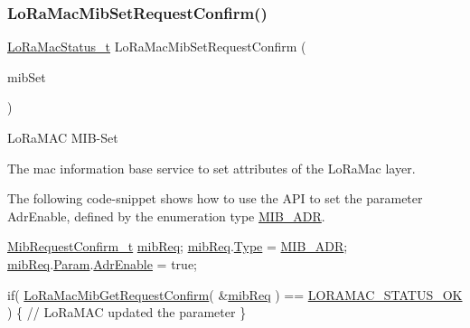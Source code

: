 \subsubsection{\texorpdfstring{Lo\+Ra\+Mac\+Mib\+Set\+Request\+Confirm()}{LoRaMacMibSetRequestConfirm()}}
{\footnotesize\ttfamily \mbox{\hyperlink{group___l_o_r_a_m_a_c_ga30bd25657e10480f8605ee951b0ecfbd}{Lo\+Ra\+Mac\+Status\+\_\+t}} Lo\+Ra\+Mac\+Mib\+Set\+Request\+Confirm (\begin{DoxyParamCaption}\item[{\mbox{\hyperlink{group___l_o_r_a_m_a_c_ga9269d5ae88dd157a58e9d60f680d63f0}{Mib\+Request\+Confirm\+\_\+t}} $\ast$}]{mib\+Set }\end{DoxyParamCaption})}



Lo\+Ra\+M\+AC M\+I\+B-\/\+Set 

The mac information base service to set attributes of the Lo\+Ra\+Mac layer.

The following code-\/snippet shows how to use the A\+PI to set the parameter Adr\+Enable, defined by the enumeration type \mbox{\hyperlink{group___l_o_r_a_m_a_c_gga32ea83d13a3f5bb4b3ec2ace2319ab61a756ff0b66217e3e4ddd0442c8aa56802}{M\+I\+B\+\_\+\+A\+DR}}.


\begin{DoxyCode}
\mbox{\hyperlink{structe_mib_request_confirm}{MibRequestConfirm\_t}} \mbox{\hyperlink{lora_8c_a553baee9b2c1a2c0aa6334bb5560f3d1}{mibReq}};
\mbox{\hyperlink{lora_8c_a553baee9b2c1a2c0aa6334bb5560f3d1}{mibReq}}.\mbox{\hyperlink{structe_mib_request_confirm_ada1f9249fb28125c69bdfacfaeeae0e2}{Type}} = \mbox{\hyperlink{group___l_o_r_a_m_a_c_gga32ea83d13a3f5bb4b3ec2ace2319ab61a756ff0b66217e3e4ddd0442c8aa56802}{MIB\_ADR}};
\mbox{\hyperlink{lora_8c_a553baee9b2c1a2c0aa6334bb5560f3d1}{mibReq}}.\mbox{\hyperlink{structe_mib_request_confirm_afb8c77b3200d879d36beed691fb71f8d}{Param}}.\mbox{\hyperlink{unionu_mib_param_a04efa8698eeea64f27b216d64e598c0d}{AdrEnable}} = \textcolor{keyword}{true};

\textcolor{keywordflow}{if}( \mbox{\hyperlink{group___l_o_r_a_m_a_c_ga3e208a4f73213aa801eeb9d9da7b71dd}{LoRaMacMibGetRequestConfirm}}( &\mbox{\hyperlink{lora_8c_a553baee9b2c1a2c0aa6334bb5560f3d1}{mibReq}} ) == 
      \mbox{\hyperlink{group___l_o_r_a_m_a_c_gga1d18f26b344040b3ec5c3db662919661a03db5fca052313edb3823c014b653a74}{LORAMAC\_STATUS\_OK}} )
\{
  \textcolor{comment}{// LoRaMAC updated the parameter}
\}
\end{DoxyCode}



